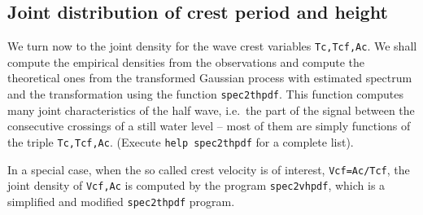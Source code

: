 \subsection{Joint distribution of crest period and height}
We turn now to the joint density for the wave crest variables
{\tt Tc,Tcf,Ac}. We shall compute the empirical densities
from the observations and compute the theoretical ones from the
transformed Gaussian process with estimated spectrum and the
transformation using the function
{\tt spec2thpdf}.
This function computes many joint characteristics of the half wave,
i.e.\ the part of the signal between the consecutive crossings
of a still water level -- most of them are simply functions of the
triple {\tt Tc,Tcf,Ac}. (Execute 
{\tt help spec2thpdf} for a complete list).

In a special case, when the so called crest velocity is of interest,
{\tt Vcf=Ac/Tcf}, the joint density of {\tt Vcf,Ac} is computed by
the program {\tt spec2vhpdf},
which is a simplified and modified
{\tt spec2thpdf} program.

